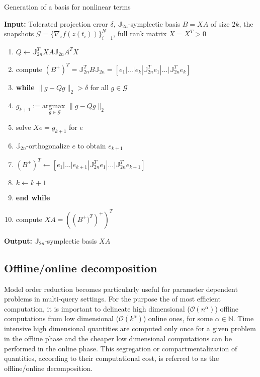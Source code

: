 \begin{algorithm} 
\caption{Generation of a basis for nonlinear terms} \label{alg:3}
{\bf Input:} Tolerated projection error $\delta$, $\mathbb J_{2n}$-symplectic basis $B = X A$ of size $2k$, the snapshots $\mathcal G = \{ \nabla_zf(z(t_i))\}_{i=1}^{N}$, full rank matrix $X=X^T>0$
\begin{enumerate}
\item $Q \leftarrow \mathbb J_{2n}^T X A \mathbb J_{2n}A^TX$
\item compute $(B^+)^T = \mathbb J_{2n}^T B \mathbb J_{2n} = [e_1|\dots |e_{k} | \mathbb J_{2n}^Te_1|\dots| \mathbb J_{2n}^Te_{k}]$
\item \textbf{while} $\| g - Q g \|_2 > \delta$ for all $g \in \mathcal G$
\item \hspace{0.5cm} $g_{k+1} := \underset{g\in \mathcal G}{\text{argmax }} \| g -  Q g  \|_2$
\item \hspace{0.5cm} solve $X e = g_{k+1}$ for $e$
\item \hspace{0.5cm} $\mathbb J_{2n}$-orthogonalize $e$ to obtain $e_{k+1}$
\item \hspace{0.5cm} $(B^+)^T \leftarrow [e_1|\dots |e_{k+1} | \mathbb J_{2n}^Te_1|\dots| \mathbb J_{2n}^Te_{k+1}]$
\item \hspace{0.5cm} $k \leftarrow k+1$
\item \textbf{end while}
\item compute $XA = \left( \left (B^+)^T \right)^+ \right)^T$
\end{enumerate}
\vspace{0.5cm}
{\bf Output:} $\mathbb J_{2n}$-symplectic basis $XA$
\end{algorithm}

\subsection{Offline/online decomposition} \label{sec:normmor.4}
Model order reduction becomes particularly useful for parameter dependent problems in multi-query settings. For the purpose the of most efficient computation, it is important to delineate high dimensional ($\mathcal{O}(n^{\alpha})$) offline computations from low dimensional ($\mathcal{O}(k^{\alpha})$) online ones, for some $\alpha \in \mathbb N$. Time intensive high dimensional quantities are computed only once for a given problem in the offline phase and the cheaper low dimensional computations can be performed in the online phase. This segregation or compartmentalization of quantities, according to their computational cost, is referred to as the offline/online decomposition.

